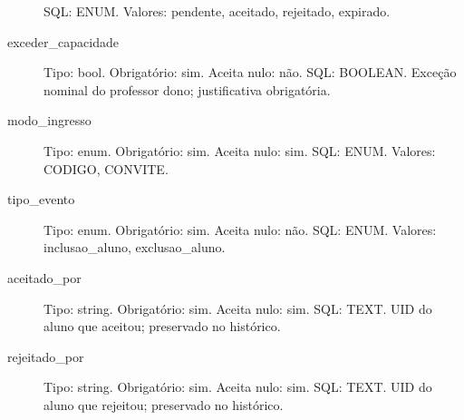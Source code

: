 \begin{description}
SQL: ENUM.
Valores: pendente, aceitado, rejeitado, expirado.
\item[exceder\_capacidade] Tipo: bool. Obrigatório: sim. Aceita nulo: não.
SQL: BOOLEAN.
Exceção nominal do professor dono; justificativa obrigatória.
\item[modo\_ingresso] Tipo: enum. Obrigatório: sim. Aceita nulo: sim.
SQL: ENUM.
Valores: CODIGO, CONVITE.
\item[tipo\_evento] Tipo: enum. Obrigatório: sim. Aceita nulo: não.
SQL: ENUM.
Valores: inclusao\_aluno, exclusao\_aluno.
\item[aceitado\_por] Tipo: string. Obrigatório: sim. Aceita nulo: sim.
SQL: TEXT.
UID do aluno que aceitou; preservado no histórico.
\item[rejeitado\_por] Tipo: string. Obrigatório: sim. Aceita nulo: sim.
SQL: TEXT.
UID do aluno que rejeitou; preservado no histórico.
\end{description}
